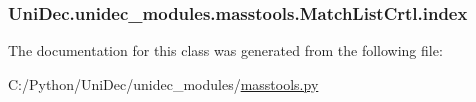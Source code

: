 \subsubsection[{index}]{\setlength{\rightskip}{0pt plus 5cm}Uni\+Dec.\+unidec\+\_\+modules.\+masstools.\+Match\+List\+Crtl.\+index}\label{class_uni_dec_1_1unidec__modules_1_1masstools_1_1_match_list_crtl_adda02edb70b3da0293b15cb196b5fd8e}


The documentation for this class was generated from the following file\+:\begin{DoxyCompactItemize}
\item 
C\+:/\+Python/\+Uni\+Dec/unidec\+\_\+modules/\hyperlink{masstools_8py}{masstools.\+py}\end{DoxyCompactItemize}
